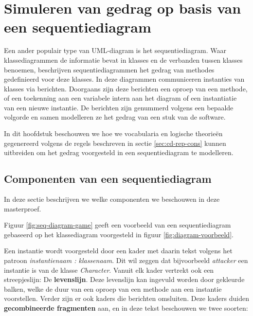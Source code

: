 \chapter{Simuleren van gedrag op basis van een sequentiediagram}\label{sec:gedrag}
Een ander populair type van UML-diagram is het sequentiediagram\cite{RumbaughJames2005Tuml}. Waar klassediagrammen de informatie bevat in klasses en de verbanden tussen klasses benoemen, beschrijven sequentiediagrammen het gedrag van methodes gedefinieerd voor deze klasses. In deze diagrammen communiceren instanties van klasses via berichten. Doorgaans zijn deze berichten een oproep van een methode, of een toekenning aan een variabele intern aan het diagram of een instantiatie van een nieuwe instantie. De berichten zijn genummerd volgens een bepaalde volgorde en samen modelleren ze het gedrag van een stuk van de software.

In dit hoofdstuk beschouwen we hoe we vocabularia en logische theorie\"en gegenereerd volgens de regels beschreven in sectie \ref{sec:cd-rep-cons} kunnen uitbreiden om het gedrag voorgesteld in een sequentiediagram te modelleren.

\section{Componenten van een sequentiediagram}

In deze sectie beschrijven we welke componenten we beschouwen in deze masterproef.

Figuur \ref{fig:seq-diagram-game} geeft een voorbeeld van een sequentiediagram gebaseerd op het klassediagram voorgesteld in figuur \ref{fig:diagram-voorbeeld}.

Een instantie wordt voorgesteld door een kader met daarin tekst volgens het patroon \textit{instantienaam : klassenaam}. Dit wil zeggen dat bijvoorbeeld \textit{attacker} een instantie is van de klasse \textit{Character}. Vanuit elk kader vertrekt ook een streepjeslijn: De \textbf{levenslijn}. Deze levenslijn kan ingevuld worden door gekleurde balken, welke de duur van een oproep van een methode aan een instantie voorstellen.
Verder zijn er ook kaders die berichten omsluiten. Deze kaders duiden \textbf{gecombineerde fragmenten} aan, en in deze tekst beschouwen we twee soorten:

